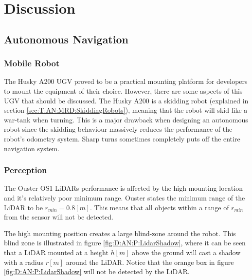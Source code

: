 \chapter{Discussion}\label{sec:Discussion}


\section{Autonomous Navigation} \label{sec:D:AutonomousNavigaion}

\subsection{Mobile Robot} \label{sec:D:AN:MobileRobot}
The Husky A200 UGV proved to be a practical mounting platform for developers to mount the equipment of their choice. However, there are some aspects of this UGV that should be discussed. The Husky A200 is a skidding robot (explained in section \ref{sec:T:AN:MRD:SkiddingRobots}), meaning that the robot will skid like a war-tank when turning. This is a major drawback when designing an autonomous robot since the skidding behaviour massively reduces the performance of the robot's odometry system. Sharp turns sometimes completely puts off the entire navigation system. 

\subsection{Perception} \label{sec:D:AN:Perception}
The Ouster OS1 LiDARs performance is affected by the high mounting location and it's relatively poor minimum range. Ouster states the minimum range of the LiDAR to be $r_{min}=0.8[m]$. This means that all objects within a range of $r_{min}$ from the sensor will not be detected.

The high mounting position creates a large blind-zone around the robot. This blind zone is illustrated in figure \ref{fig:D:AN:P:LidarShadow}, where it can be seen that a LiDAR mounted at a height $h[m]$ above the ground will cast a shadow with a radius $r[m]$ around the LiDAR. Notice that the orange box in figure \ref{fig:D:AN:P:LidarShadow} will not be detected by the LiDAR.

